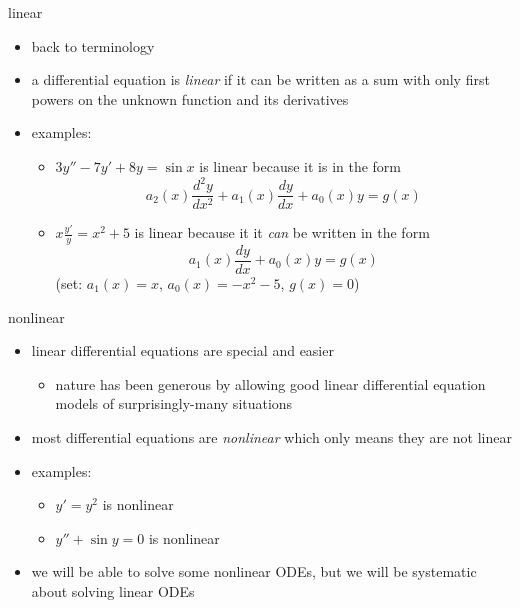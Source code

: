 \documentclass{beamer}
\begin{document}
\begin{frame}{linear}

\begin{itemize}
\item back to terminology
\item a differential equation is \emph{linear} if it can be written as a sum with only first powers on the unknown function and its derivatives
\item examples:
    \begin{itemize}
    \item $3 y'' - 7 y' + 8 y = \sin x$ is linear because it is in the form
        $$a_2(x) \frac{d^2y}{dx^2} + a_1(x) \frac{dy}{dx} + a_0(x) y = g(x)$$
    \item $x \frac{y'}{y} = x^2 + 5$ is linear because it it \emph{can} be written in the form
        $$a_1(x) \frac{dy}{dx} + a_0(x) y = g(x)$$
    (set: $a_1(x)=x$, $a_0(x)=-x^2-5$, $g(x)=0$)
    \end{itemize}
\end{itemize}
\end{frame}


\begin{frame}{nonlinear}

\begin{itemize}
\item linear differential equations are special and easier
    \begin{itemize}
    \item nature has been generous by allowing good linear differential equation models of surprisingly-many situations
    \end{itemize}
\item most differential equations are \emph{nonlinear} which only means they are not linear
\item examples:
    \begin{itemize}
    \item $y' = y^2$ is nonlinear
    \item $y'' + \sin y =0$ is nonlinear
    \end{itemize}
\item we will be able to solve some nonlinear ODEs, but we will be systematic about solving linear ODEs
\end{itemize}
\end{frame}
\end{document}
